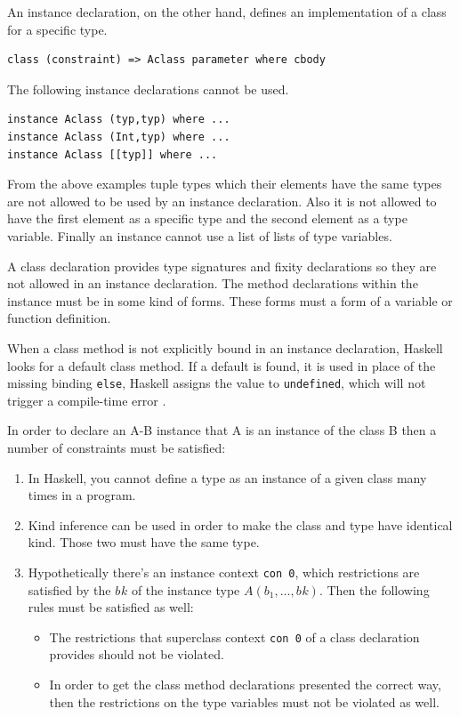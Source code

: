 \documentclass[a4paper, titlepage, twoside]{article}
\begin{document}
An instance declaration, on the other hand, defines an implementation of a class for a specific type.

\begin{verbatim}
class (constraint) => Aclass parameter where cbody
\end{verbatim}

The following instance declarations cannot be used.

\begin{verbatim}
instance Aclass (typ,typ) where ...
instance Aclass (Int,typ) where ...
instance Aclass [[typ]] where ...
\end{verbatim}

From the above examples tuple types which their elements have the same types are not allowed to be used by an instance declaration. Also it is not allowed to have the first element as a specific type and the second element as a type variable. Finally an instance cannot use a list of lists of type variables.

A class declaration provides type signatures and fixity declarations so they are not allowed in an instance declaration. The method declarations within the instance must be in some kind of forms. These forms must a form of a variable or function definition.

When a class method is not explicitly bound in an instance declaration, Haskell looks for a default
class method. If a default is found, it is used in place of the missing binding \texttt{else}, Haskell assigns the
value to \texttt{undefined}, which will not trigger a compile-time error \autocite{marlowHaskell2010Language2010}.

In order to declare an A-B instance that A is an instance of the class B then a number of constraints must be satisfied:

\begin{enumerate}
\item In Haskell, you cannot define a type as an instance of a given class many times in a program.

\item Kind inference can be used in order to make the class and type have identical kind. Those two must have the same type.

\item Hypothetically there’s an instance context \texttt{con 0}, which restrictions are satisfied by the \(b_{}k\) of the instance type \(A(b_1, \dots, b_{}k)\). Then the following rules must be satisfied as well:

\begin{itemize}
\item The restrictions that superclass context \texttt{con 0} of a class declaration provides should not be violated.

\item In order to get the class method declarations presented the correct way, then the restrictions on the type variables must not be violated as well.
\end{itemize}
\end{enumerate}
\end{document}
